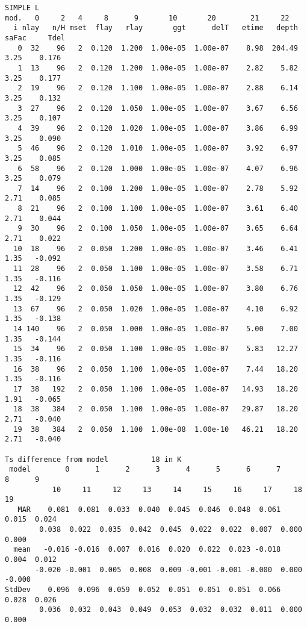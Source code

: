 \documentclass{article}
\begin{document}
\begin{table} \caption [KRCsimple run L models]
{Values for the models in SIMPLE run L.  
Columns with numbers correspond to model parameters in Table \ref{sparm}; 
saFac is the stability safety factor for the top layer. Tdel is the surface
temperature at 7 hours (index 14) relative to the average for all models, to
help in curve identification. Lower part: Difference of surface temperature from
model 18 over the 48 output times; MAR= Mean absolute residual } \label{srunL}
\begin{verbatim}
SIMPLE L
mod.   0     2   4     8      9       10       20        21     22 
  i nlay   n/H mset  flay   rlay       ggt      delT   etime   depth  saFac     Tdel
   0  32    96   2  0.120  1.200  1.00e-05  1.00e-07    8.98  204.49   3.25    0.176
   1  13    96   2  0.120  1.200  1.00e-05  1.00e-07    2.82    5.82   3.25    0.177
   2  19    96   2  0.120  1.100  1.00e-05  1.00e-07    2.88    6.14   3.25    0.132
   3  27    96   2  0.120  1.050  1.00e-05  1.00e-07    3.67    6.56   3.25    0.107
   4  39    96   2  0.120  1.020  1.00e-05  1.00e-07    3.86    6.99   3.25    0.090
   5  46    96   2  0.120  1.010  1.00e-05  1.00e-07    3.92    6.97   3.25    0.085
   6  58    96   2  0.120  1.000  1.00e-05  1.00e-07    4.07    6.96   3.25    0.079
   7  14    96   2  0.100  1.200  1.00e-05  1.00e-07    2.78    5.92   2.71    0.085
   8  21    96   2  0.100  1.100  1.00e-05  1.00e-07    3.61    6.40   2.71    0.044
   9  30    96   2  0.100  1.050  1.00e-05  1.00e-07    3.65    6.64   2.71    0.022
  10  18    96   2  0.050  1.200  1.00e-05  1.00e-07    3.46    6.41   1.35   -0.092
  11  28    96   2  0.050  1.100  1.00e-05  1.00e-07    3.58    6.71   1.35   -0.116
  12  42    96   2  0.050  1.050  1.00e-05  1.00e-07    3.80    6.76   1.35   -0.129
  13  67    96   2  0.050  1.020  1.00e-05  1.00e-07    4.10    6.92   1.35   -0.138
  14 140    96   2  0.050  1.000  1.00e-05  1.00e-07    5.00    7.00   1.35   -0.144
  15  34    96   2  0.050  1.100  1.00e-05  1.00e-07    5.83   12.27   1.35   -0.116
  16  38    96   2  0.050  1.100  1.00e-05  1.00e-07    7.44   18.20   1.35   -0.116
  17  38   192   2  0.050  1.100  1.00e-05  1.00e-07   14.93   18.20   1.91   -0.065
  18  38   384   2  0.050  1.100  1.00e-05  1.00e-07   29.87   18.20   2.71   -0.040
  19  38   384   2  0.050  1.100  1.00e-08  1.00e-10   46.21   18.20   2.71   -0.040

Ts difference from model          18 in K
 model        0      1      2      3      4      5      6      7      8      9
           10     11     12     13     14     15     16     17     18     19
   MAR    0.081  0.081  0.033  0.040  0.045  0.046  0.048  0.061  0.015  0.024
        0.038  0.022  0.035  0.042  0.045  0.022  0.022  0.007  0.000  0.000
  mean   -0.016 -0.016  0.007  0.016  0.020  0.022  0.023 -0.018  0.004  0.012
       -0.020 -0.001  0.005  0.008  0.009 -0.001 -0.001 -0.000  0.000 -0.000
StdDev    0.096  0.096  0.059  0.052  0.051  0.051  0.051  0.066  0.028  0.026
        0.036  0.032  0.043  0.049  0.053  0.032  0.032  0.011  0.000  0.000
\end{verbatim}
\vspace{-3.0mm}
\hrulefill \end{table} 
\end{document}
